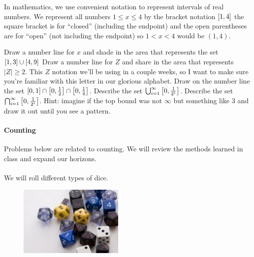 \documentclass[12pt]{article}
\begin{document}
\problem In mathematics, we use convenient notation to represent intervals of real numbers. We represent all numbers $1 \leq x \leq 4$ by the bracket notation $\left[1,4\right]$ the square bracket is for ``closed'' (including the endpoint) and the open parentheses are for ``open'' (not including the endpoint) so $1 < x < 4$ would be $(1,4)$.

\begin{enumerate}
\easysubproblem Draw a number line for $x$ and shade in the area that represents the set $\left[1,3\right] \cup \left[4,9\right]$
\easysubproblem Draw a number line for $Z$ and share in the area that represents $|Z| \geq 2$. This $Z$ notation we'll be using in a couple weeks, so I want to make sure you're familiar with this letter in our glorious alphabet.
\easysubproblem Draw on the number line the set $\left[0,1\right] \cap \left[0, \frac{1}{2}\right] \cap \left[0, \frac{1}{4}\right]$.
\intermediatesubproblem Describe the set $\bigcup_{i=1}^\infty \left[0, \frac{1}{2^i}\right]$. 
\hardsubproblem Describe the set $\bigcap_{i=1}^\infty \left[0, \frac{1}{2^i}\right]$. Hint: imagine if the top bound was not $\infty$ but something like 3 and draw it out until you see a pattern.
\end{enumerate}


\paragraph{Counting} Problems below are related to counting. We will review the methods learned in class and expand our horizons. \\ \\


\problem We will roll different types of dice. 

\begin{figure}[htp]
\centering
\includegraphics[width=2in, height=1.35in]{dice.jpg}
\end{figure}
\FloatBarrier
\end{document}
